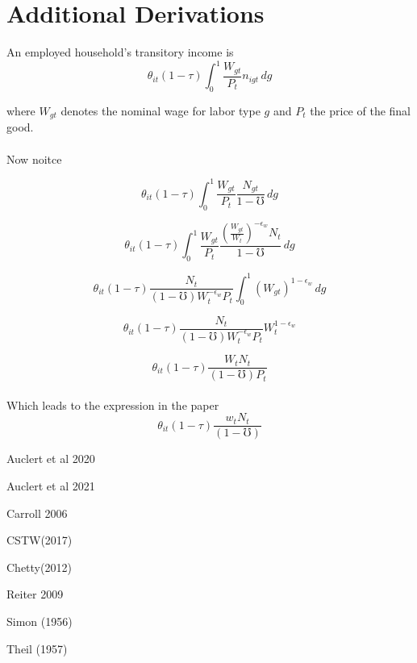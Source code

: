 \documentclass[titlepage]{\econtex}\providecommand{\texname}{BufferStockTheory}
\begin{document}
  
\hypertarget{Additional Derivations}{}
\section{Additional Derivations} 

An employed household's transitory income is \\

$$ \theta_{it}(1-\tau) \int_{0}^{1} \frac{W_{gt}}{P_{t}}n_{igt}\,dg$$

where $W_{gt}$ denotes the nominal wage for labor type $g$ and $P_{t}$ the price of the final good. \\ \\

Now noitce

$$ \theta_{it}(1-\tau) \int_{0}^{1} \frac{W_{gt}}{P_{t}}\frac{N_{gt}}{1-\mho}\,dg$$

$$ \theta_{it}(1-\tau) \int_{0}^{1} \frac{W_{gt}}{P_{t}}\frac{\left(\frac{W_{gt}}{W_{t}}\right)^{-\epsilon_{w}} N_{t}}{1-\mho}\,dg$$

$$ \theta_{it}(1-\tau) \frac{N_{t}}{(1-\mho) W_{t}^{-\epsilon_{w}}P_{t}} \int_{0}^{1}  \left(W_{gt}\right)^{1-\epsilon_{w}} \,dg $$

$$\theta_{it}(1-\tau) \frac{N_{t}}{(1-\mho) W_{t}^{-\epsilon_{w}}P_{t}} W_{t}^{1-\epsilon_{w}} $$

$$ \theta_{it}(1-\tau) \frac{W_{t}N_{t}}{(1-\mho)P_{t} }$$\\

Which leads to the expression in the paper \\

$$ \theta_{it}(1-\tau) \frac{w_{t}N_{t}}{(1-\mho)}$$



Auclert et al 2020

Auclert et al 2021

Carroll 2006

CSTW(2017)

 Chetty(2012)

Reiter 2009

Simon (1956)

Theil (1957)
\end{document}
